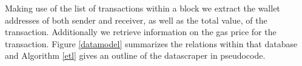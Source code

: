 Making use of the list of transactions within a block we extract the wallet addresses of both sender and receiver, as well as the total value, of the transaction. Additionally we retrieve information on the gas price for the transaction. Figure \ref{datamodel} summarizes the relations within that database and Algorithm \ref{etl} gives an outline of the datascraper in pseudocode.
